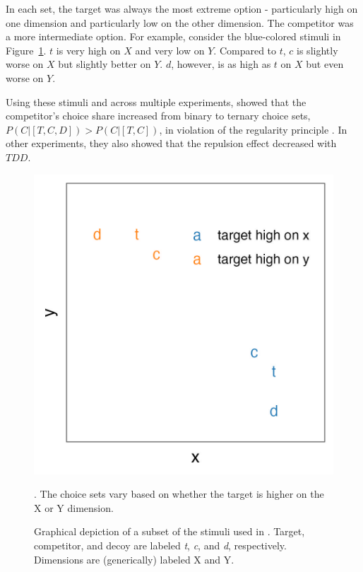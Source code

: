 In each set, the target was always the most extreme option - particularly high on one dimension and particularly low on the other dimension. The competitor was a more intermediate option. For example, consider the blue-colored stimuli in Figure~\ref{fig:banerjee_stim}. $t$ is very high on $X$ and very low on $Y$. Compared to $t$, $c$ is slightly worse on $X$ but slightly better on $Y$. $d$, however, is as high as $t$ on $X$ but even worse on $Y$. 

Using these stimuli and across multiple experiments, \textcite{banerjeeFactorsThatPromote2024} showed that the competitor's choice share increased from binary to ternary choice sets, $P(C|[T,C,D])>P(C|[T,C])$, in violation of the regularity principle \parencite{marley1989random}. In other experiments, they also showed that the repulsion effect decreased with $TDD$.

\begin{figure}
    \includegraphics{figures/banerjee_stim.jpeg}
    \caption{Graphical depiction of a subset of the stimuli used in \textcite{banerjeeFactorsThatPromote2024}. Target, competitor, and decoy are labeled \textit{t}, \textit{c}, and \textit{d}, respectively. Dimensions are (generically) labeled X and Y.}. The choice sets vary based on whether the target is higher on the X or Y dimension.
    \label{fig:banerjee_stim}
\end{figure}

